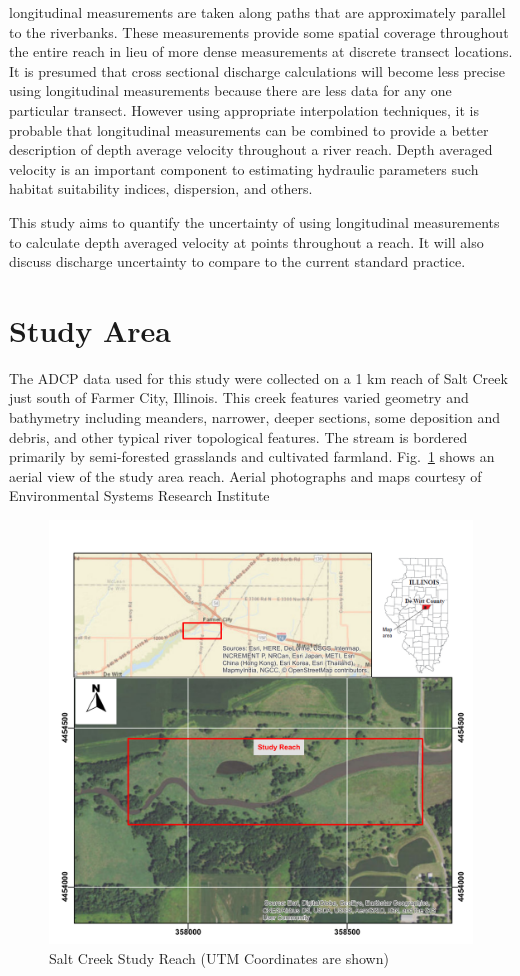 \documentclass[Journal,letterpaper,BackFigs]{ascelike-new}
\begin{document}
longitudinal measurements are taken along paths that are approximately parallel to the riverbanks. These measurements provide some spatial coverage throughout the entire reach in lieu of more dense measurements at discrete transect locations. It is presumed that cross sectional discharge calculations will become less precise using longitudinal measurements because there are less data for any one particular transect. However using appropriate interpolation techniques, it is probable that longitudinal measurements can be combined to provide a better description of depth average velocity throughout a river reach. Depth averaged velocity is an important component to estimating hydraulic parameters such habitat suitability indices, dispersion, and others. 

This study aims to quantify the uncertainty of using longitudinal measurements to calculate depth averaged velocity at points throughout a reach. It will also discuss discharge uncertainty to compare to the current standard practice.

\section{Study Area}
The ADCP data used for this study were collected on a 1 km reach of Salt Creek just south of Farmer City, Illinois. This creek features varied geometry and bathymetry including meanders, narrower, deeper sections, some deposition and debris, and other typical river topological features. The stream is bordered primarily by semi-forested grasslands and cultivated farmland. Fig.~\ref{fig:SiteOverview} shows an aerial view of the study area reach. Aerial photographs and maps courtesy of Environmental Systems Research Institute \cite{ESRI:2017}

\begin{figure}
\centering
\includegraphics[width=\textwidth]{SiteOverview.pdf}
\caption{Salt Creek Study Reach (UTM Coordinates are shown)}
\label{fig:SiteOverview}
\end{figure}
\end{document}
